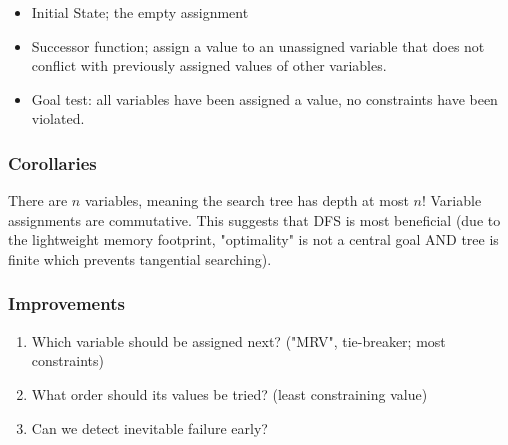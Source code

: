 \documentclass{article}
\begin{document}
\begin{itemize}
	\item Initial State; the empty assignment
	\item Successor function; assign a value to an unassigned variable that does not conflict with previously assigned values of other variables.
	\item Goal test: all variables have been assigned a value, no constraints have been violated.
\end{itemize}

\subsubsection*{Corollaries}
There are $n$ variables, meaning the search tree has depth at most $n$! Variable assignments are commutative. This suggests that DFS is most beneficial (due to the lightweight memory footprint, "optimality" is not a central goal AND tree is finite which prevents tangential searching).

\subsubsection{Improvements}
\begin{enumerate}
	\item Which variable should be assigned next? ("MRV", tie-breaker; most constraints)
	\item What order should its values be tried? (least constraining value)
	\item Can we detect inevitable failure early?
\end{enumerate}
\end{document}

